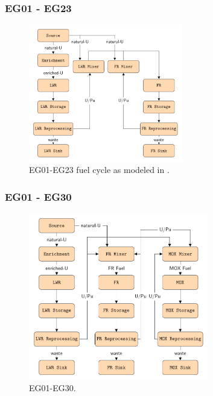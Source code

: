 \begin{frame}
\frametitle{EG01 - EG23}

\begin{figure}[H]
\centering
\includegraphics[width=0.6\textwidth]{images/23flow.pdf}
\hfill
\caption{EG01-EG23 fuel cycle as modeled in \Cyclus.}
\label{fig:23flow}
\end{figure}
\end{frame}

\begin{frame}
\frametitle{EG01 - EG30}

\begin{figure}[H]
\centering
\includegraphics[width=0.7\textwidth]{images/29flow.pdf}
\hfill
\caption{EG01-EG30.}
\label{fig:30flow}
\end{figure}
\end{frame}

